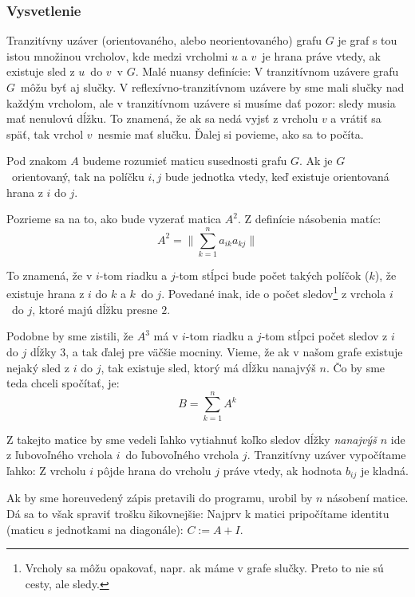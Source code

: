         \subsubsection{Vysvetlenie}
        Tranzitívny uzáver (orientovaného, alebo neorientovaného) grafu $G$ je graf s tou istou množinou vrcholov,
        kde medzi vrcholmi $u$ a $v$ je hrana práve vtedy, ak existuje sled z $u$ do $v$ v $G$. Malé nuansy definície:
        V tranzitívnom uzávere grafu $G$ môžu byť aj slučky. V reflexívno-tranzitívnom uzávere by sme mali slučky nad
        každým vrcholom, ale v tranzitívnom uzávere si musíme dať pozor: sledy musia mať nenulovú dĺžku. To znamená, že
        ak sa nedá vyjsť z vrcholu $v$ a vrátiť sa späť, tak vrchol $v$ nesmie mať slučku. Ďalej si povieme,
        ako sa to počíta.

        Pod znakom $A$ budeme rozumieť maticu susednosti grafu $G$. Ak je $G$ orientovaný, tak na políčku $i,j$ bude
        jednotka vtedy, keď existuje orientovaná hrana z $i$ do $j$.

        Pozrieme sa na to, ako bude vyzerať matica $A^2$. Z definície násobenia matíc:
        $$ A^2 = \| \sum_{k=1}^n a_{ik}a_{kj} \| $$

        To znamená, že v $i$-tom riadku a $j$-tom stĺpci bude počet takých políčok ($k$), že existuje hrana z $i$
        do $k$ a $k$ do $j$. Povedané inak, ide o počet sledov\footnote{Vrcholy sa môžu opakovať, napr. ak máme v grafe
        slučky. Preto to nie sú cesty, ale sledy.} z vrchola $i$ do $j$, ktoré majú dĺžku presne $2$.

        Podobne by sme zistili, že $A^3$ má v $i$-tom riadku a $j$-tom stĺpci počet sledov z $i$ do $j$
        dĺžky $3$, a tak ďalej pre väčšie mocniny. Vieme, že ak v našom grafe existuje nejaký sled z $i$
        do $j$, tak existuje sled, ktorý má dĺžku nanajvýš $n$. Čo by sme teda chceli spočítať, je:
        $$ B = \sum_{k=1}^{n} A^k $$

        Z takejto matice by sme vedeli ľahko vytiahnuť koľko sledov dĺžky \emph{nanajvýš $n$} ide z ľubovoľného
        vrchola $i$ do ľubovoľného vrchola $j$. Tranzitívny uzáver vypočítame ľahko:
        Z vrcholu $i$ pôjde hrana do vrcholu $j$ práve vtedy, ak hodnota $b_{ij}$ je kladná.

        Ak by sme horeuvedený zápis pretavili do programu, urobil by $n$ násobení matice. Dá sa to však spraviť
        trošku šikovnejšie: Najprv k matici pripočítame identitu (maticu s jednotkami na diagonále): $C := A + I$.
        

